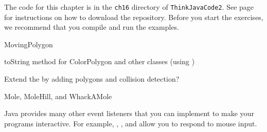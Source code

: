 The code for this chapter is in the {\tt ch16} directory of {\tt ThinkJavaCode2}.
See page~\pageref{code} for instructions on how to download the repository.
Before you start the exercises, we recommend that you compile and run the examples.


\begin{exercise}
MovingPolygon
\end{exercise}


\begin{exercise}
toString method for ColorPolygon and other classes (using )
\end{exercise}


\begin{exercise}
Extend the  by adding polygons and collision detection?
\end{exercise}


\begin{exercise}
Mole, MoleHill, and WhackAMole

Java provides many other event listeners that you can implement to make your programs interactive.
For example, , , and  allow you to respond to mouse input.
\end{exercise}
